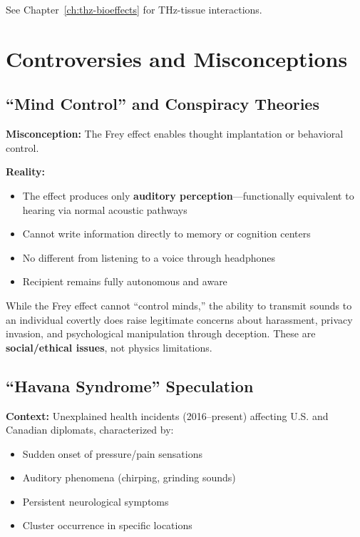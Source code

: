 See Chapter~\ref{ch:thz-bioeffects} for THz-tissue interactions.

\section{Controversies and Misconceptions}

\subsection{``Mind Control'' and Conspiracy Theories}

\textbf{Misconception:} The Frey effect enables thought implantation or behavioral control.

\textbf{Reality:}
\begin{itemize}
\item The effect produces only \textbf{auditory perception}---functionally equivalent to hearing via normal acoustic pathways
\item Cannot write information directly to memory or cognition centers
\item No different from listening to a voice through headphones
\item Recipient remains fully autonomous and aware
\end{itemize}

\begin{warningbox}
While the Frey effect cannot ``control minds,'' the ability to transmit sounds to an individual covertly does raise legitimate concerns about harassment, privacy invasion, and psychological manipulation through deception. These are \textbf{social/ethical issues}, not physics limitations.
\end{warningbox}

\subsection{``Havana Syndrome'' Speculation}

\textbf{Context:} Unexplained health incidents (2016--present) affecting U.S. and Canadian diplomats, characterized by:
\begin{itemize}
\item Sudden onset of pressure/pain sensations
\item Auditory phenomena (chirping, grinding sounds)
\item Persistent neurological symptoms
\item Cluster occurrence in specific locations
\end{itemize}

